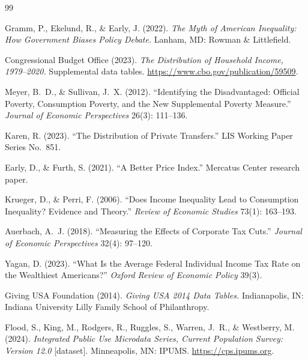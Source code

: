 \documentclass[11pt,letterpaper]{article}
\begin{document}
\begin{thebibliography}{99}

 Gramm, P., Ekelund, R., \& Early, J. (2022).
\emph{The Myth of American Inequality: How Government Biases Policy Debate.}
Lanham, MD: Rowman \& Littlefield.

 Congressional Budget Office (2023).
\emph{The Distribution of Household Income, 1979--2020.} Supplemental data
tables. \url{https://www.cbo.gov/publication/59509}.

 Meyer, B.~D., \& Sullivan, J.~X. (2012). ``Identifying
the Disadvantaged: Official Poverty, Consumption Poverty, and the New
Supplemental Poverty Measure.'' \emph{Journal of Economic Perspectives}
26(3): 111--136.

 Karen, R. (2023). ``The Distribution of Private
Transfers.'' LIS Working Paper Series No.~851.

 Early, D., \& Furth, S. (2021). ``A Better Price
Index.'' Mercatus Center research paper.

 Krueger, D., \& Perri, F. (2006). ``Does Income
Inequality Lead to Consumption Inequality? Evidence and Theory.''
\emph{Review of Economic Studies} 73(1): 163--193.

 Auerbach, A.~J. (2018). ``Measuring the Effects of
Corporate Tax Cuts.'' \emph{Journal of Economic Perspectives} 32(4): 97--120.

 Yagan, D. (2023). ``What Is the Average Federal Individual
Income Tax Rate on the Wealthiest Americans?'' \emph{Oxford Review of
Economic Policy} 39(3).

 Giving USA Foundation (2014). \emph{Giving USA
2014 Data Tables.} Indianapolis, IN: Indiana University Lilly Family School
of Philanthropy.

 Flood, S., King, M., Rodgers, R., Ruggles, S., Warren,
J.~R., \& Westberry, M. (2024). \emph{Integrated Public Use Microdata
Series, Current Population Survey: Version 12.0} [dataset]. Minneapolis,
MN: IPUMS. \url{https://cps.ipums.org}.

\end{thebibliography}
\end{document}
